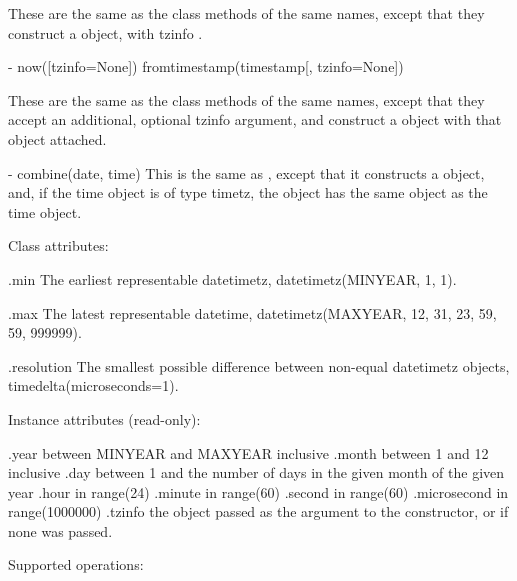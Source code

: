     These are the same as the  class methods of the
    same names, except that they construct a 
    object, with tzinfo .

  - now([tzinfo=None])
    fromtimestamp(timestamp[, tzinfo=None])

    These are the same as the  class methods of the same names,
    except that they accept an additional, optional tzinfo argument, and
    construct a  object with that  object attached.

  - combine(date, time)
    This is the same as , except that it constructs
    a  object, and, if the time object is of type timetz,
    the  object has the same  object as the time object.

Class attributes:

    .min
        The earliest representable datetimetz,
        datetimetz(MINYEAR, 1, 1).

    .max
        The latest representable datetime,
        datetimetz(MAXYEAR, 12, 31, 23, 59, 59, 999999).

    .resolution
        The smallest possible difference between non-equal datetimetz
        objects, timedelta(microseconds=1).

Instance attributes (read-only):

    .year           between MINYEAR and MAXYEAR inclusive
    .month          between 1 and 12 inclusive
    .day            between 1 and the number of days in the given month
                    of the given year
    .hour           in range(24)
    .minute         in range(60)
    .second         in range(60)
    .microsecond    in range(1000000)
    .tzinfo         the object passed as the  argument to
                    the  constructor, or 
                    if none was passed.

Supported operations:

